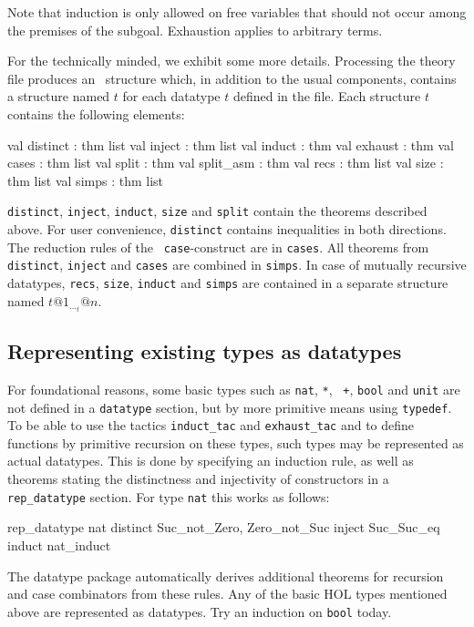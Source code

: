 Note that induction is only allowed on free variables that should not occur
among the premises of the subgoal.  Exhaustion applies to arbitrary terms.

\bigskip


For the technically minded, we exhibit some more details.  Processing the
theory file produces an \ML\ structure which, in addition to the usual
components, contains a structure named $t$ for each datatype $t$ defined in
the file.  Each structure $t$ contains the following elements:
\begin{ttbox}
val distinct : thm list
val inject : thm list
val induct : thm
val exhaust : thm
val cases : thm list
val split : thm
val split_asm : thm
val recs : thm list
val size : thm list
val simps : thm list
\end{ttbox}
\texttt{distinct}, \texttt{inject}, \texttt{induct}, \texttt{size}
and \texttt{split} contain the theorems
described above.  For user convenience, \texttt{distinct} contains
inequalities in both directions.  The reduction rules of the {\tt
  case}-construct are in \texttt{cases}.  All theorems from {\tt
  distinct}, \texttt{inject} and \texttt{cases} are combined in \texttt{simps}.
In case of mutually recursive datatypes, \texttt{recs}, \texttt{size}, \texttt{induct}
and \texttt{simps} are contained in a separate structure named $t@1_\ldots_t@n$.


\subsection{Representing existing types as datatypes}\label{subsec:datatype:rep_datatype}

For foundational reasons, some basic types such as \texttt{nat}, \texttt{*}, {\tt
  +}, \texttt{bool} and \texttt{unit} are not defined in a \texttt{datatype} section,
but by more primitive means using \texttt{typedef}. To be able to use the
tactics \texttt{induct_tac} and \texttt{exhaust_tac} and to define functions by
primitive recursion on these types, such types may be represented as actual
datatypes.  This is done by specifying an induction rule, as well as theorems
stating the distinctness and injectivity of constructors in a {\tt
  rep_datatype} section.  For type \texttt{nat} this works as follows:
\begin{ttbox}
rep_datatype nat
  distinct Suc_not_Zero, Zero_not_Suc
  inject   Suc_Suc_eq
  induct   nat_induct
\end{ttbox}
The datatype package automatically derives additional theorems for recursion
and case combinators from these rules.  Any of the basic HOL types mentioned
above are represented as datatypes.  Try an induction on \texttt{bool}
today.


